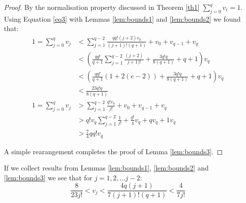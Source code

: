 \documentclass[12pt]{article} %
\theoremstyle{definition}
\begin{document}
 \begin{proof}
 By the normalisation property discussed in Theorem \ref{th1} $\sum_{j=0}^{q}v_{i} = 1$.  Using Equation \ref{eq3} with Lemmas \ref{lem:bounds1} and \ref{lem:bounds2} we found that:
 \begin{align}
  1 = \sum_{j=0}^{q}v_{j} &< \sum_{j=1}^{q-2}\frac{qq!(j+2)v_{q}}{(j+1)!(q+1)} + v_{0} + v_{q-1} + v_{q} \\
  &<\left( \frac{qq!}{q+1}\sum_{j=1}^{q-2}\frac{(j+2)}{j+1)!} + \frac{3q!q}{8(q+1)} + q + 1 \right) v_{q}\\
  &<\left( \frac{qq!}{q+1}(1 + 2(e-2))+ \frac{3q!q}{8(q+1)} + q + 1 \right) v_{q}\\
  &<\frac{23q!q}{8(q+1)} \\
  1 = \sum_{j=0}^{q}v_{j} &> \sum_{j=1}^{q-2}\frac{q!v_{q}}{j!} + v_{0} + v_{q-1} + v_{q} \\
  &> q!v_{q} \sum_{j=1}^{q-2}\frac{1}{j!} + \frac{q!}{4}v_{q} + qv_{q} + 1v_{q} \\
  &> \frac{7}{4}qq!v_{q}
\end{align}
 
 
A simple rearangement completes the proof of Lemma \ref{lem:bounds3}.
\end{proof}

If we collect results from Lemmas \ref{lem:bounds1}, \ref{lem:bounds2} and \ref{lem:bounds3} we see that for $j = 1,2,\dots j-2$:
\begin{equation}\label{eq:9}
\frac{8}{23j!} < v_{j} < \frac{4q(j+1)}{7(j+1)!(q+1)} < \frac{4}{7j!}
\end{equation}
\end{document}
